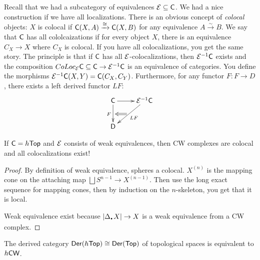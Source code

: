 Recall that we had a subcategory of equivalences $\mathcal{E}\subseteq \text{\sf C}$. We had a nice construction if we have all localizations. There is an obvious concept of \emph{colocal} objects: $X$ is colocal if $\text{\sf C}(X,A)\xrightarrow\cong \text{\sf C}(X,B)$ for any equivalence $A\xrightarrow\sim B$. We say that $\text{\sf C}$ has all cololcaizations if for every object $X$, there is an equivalence $C_X\to X$ where $C_X$ is colocal. If you have all colocalizations, you get the same story. The principle is that if $\text{\sf C}$ has all $\mathcal{E}$-colocalizations, then $\mathcal{E}^{-1}\text{\sf C}$ exists and the composition $CoLoc_{\mathcal{E}} \text{\sf C}\subseteq \text{\sf C}\to \mathcal{E}^{-1}\text{\sf C}$ is an equivalence of categories. You define the morphisms $\mathcal{E}^{-1}\text{\sf C}(X,Y)=\text{\sf C}(C_X,C_Y)$. Furthermore, for any functor $F\colon F\to D$, there exists a left derived functor $LF$:
\[\xymatrix{
 \C\ar[d]_F^{}="b" \ar[r] & \E^{-1}\C\ar[dl]^{LF}_{}="a"\\
 \D
 \ar@{=>} "a";"b"
}\]

\begin{theorem}
 If $\text{\sf C}=h\text{\sf Top}$ and $\mathcal{E}$ consists of weak equivalences, then CW complexes are colocal and all colocalizations exist!
\end{theorem}
\begin{proof}
 By definition of weak equivalence, spheres a colocal. $X^{(n)}$ is the mapping cone on the attaching map $\bigsqcup S^{n-1}\to X^{(n-1)}$. Then use the long exact sequence for mapping cones, then by induction on the $n$-skeleton, you get that it is local.
 
 Weak equivalence exist because $|\Delta_\udot X|\to X$ is a weak equivalence from a CW complex.
\end{proof}
\begin{corollary}
 The derived category $\operatorname{\sf Der}(h\text{\sf Top})\cong \operatorname{\sf Der}(\text{\sf Top})$ of topological spaces is equivalent to $h\text{\sf CW}$.
\end{corollary}